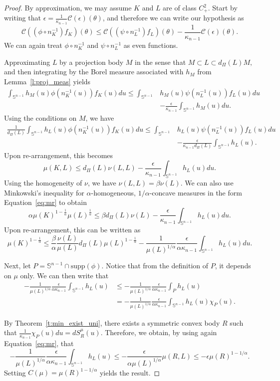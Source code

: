 \documentclass[11pt]{amsart}
\theoremstyle{definition}
\theoremstyle{remark}
\numberwithin{equation}{section}
\newcommand{\s}{\mathbb{S}}
\newcommand{\ct}[2]{\mathcal{C}({#1})({#2})}
\begin{document}
\begin{proof}
By approximation, we may assume $K$ and $L$ are of class $C^2_+$. Start by writing that $\epsilon=\frac{1}{\kappa_{n-1}}\ct{\epsilon}{\theta}$, and therefore we can write our hypothesis as
$$\ct{\left(\phi\circ n_K^{-1}\right)f_K}{\theta} \leq \ct{\left(\psi\circ n_L^{-1}\right)f_L}{\theta}-\frac{1}{\kappa_{n-1}}\ct{\epsilon}{\theta}.$$
We can again treat $\phi\circ n^{-1}_K$ and $\psi\circ n^{-1}_L$ as even functions.

Approximating $L$ by a projection body $M$ in the sense that $M\subset L \subset d_{\Pi}(L) M,$ and then integrating by the Borel measure associated with $h_M$ from Lemma~\ref{l:proj_meas} yields
\begin{align*}\int_{\s^{n-1}}h_M(u)\phi\left(n_{K}^{-1}(u)\right) f_{K}(u) du \leq \int_{\s^{n-1}} &h_M(u) \psi\left(n_L^{-1}(u)\right)f_L (u)du 
\\
&- \frac{\epsilon}{\kappa_{n-1}}\int_{\s^{n-1}}h_M(u)du.\end{align*}
Using the conditions on $M$, we have
\begin{align*}\frac{1}{d_{\Pi}(L)}\int_{\s^{n-1}}h_L(u)\phi\left(n_{K}^{-1}(u)\right) f_{K}(u) du \leq \int_{\s^{n-1}} &h_L(u) \psi\left( n_L^{-1}(u)\right)f_L (u)du
\\
&-\frac{\epsilon}{\kappa_{n-1}d_{\Pi}(L)}\int_{\s^{n-1}}h_L(u).
\end{align*}
Upon re-arrangement, this becomes
$$\mu(K,L)\leq d_{\Pi}(L)\nu(L,L)-\frac{\epsilon}{\kappa_{n-1}}\int_{\s^{n-1}}h_L(u)du.$$
Using the homogeneity of $\nu$, we have $\nu(L,L)=\beta\nu(L).$ We can also use Minkowski's inequality for $\alpha$-homogeneous, $1/\alpha$-concave measures in the form Equation~\ref{eq:mr} to obtain
$$\alpha\mu(K)^{1-\frac{1}{\alpha}} \mu(L)^{\frac{1}{\alpha}}\leq \beta d_{\Pi}(L)\nu(L)-\frac{\epsilon}{\kappa_{n-1}}\int_{\s^{n-1}}h_L(u)du.$$
Upon re-arrangement, this can be written as
$$\mu(K)^{1-\frac{1}{\alpha}} \leq \frac{\beta}{\alpha}\frac{\nu(L)}{\mu(L)} d_{\Pi}(L)\mu(L)^{1-\frac{1}{\alpha}}-\frac{1}{\mu(L)^{1/\alpha}}\frac{\epsilon}{\alpha\kappa_{n-1}}\int_{\s^{n-1}}h_L(u)du.$$

Next, let $P=\s^{n-1}\cap \text{supp}(\phi)$. Notice that from the definition of $P$, it depends on $\mu$ only. We can then write that
\begin{align*}-\frac{1}{\mu(L)^{1/\alpha}}\frac{\epsilon}{\alpha\kappa_{n-1}}\int_{\s^{n-1}}h_L(u)&\leq -\frac{1}{\mu(L)^{1/\alpha}}\frac{\epsilon}{\alpha\kappa_{n-1}}\int_{P}h_L(u)
\\
&= -\frac{1}{\mu(L)^{1/\alpha}}\frac{\epsilon}{\alpha\kappa_{n-1}}\int_{\s^{n-1}}h_L(u)\chi_P(u).
\end{align*}

By Theorem~\ref{t:min_exist_uni}, there exists a symmetric convex body $R$ such that $\frac{1}{\kappa_{n-1}}\chi_P(u)du=dS^{\mu}_{R}(u).$ Therefore, we obtain, by using again Equation~\ref{eq:mr}, that
$$-\frac{1}{\mu(L)^{1/\alpha}}\frac{\epsilon}{\alpha\kappa_{n-1}}\int_{\s^{n-1}}h_L(u)\leq -\frac{\epsilon}{\alpha\mu(L)^{1/\alpha}}\mu(R,L)\leq -\epsilon \mu(R)^{1-1/\alpha}.$$
Setting $C(\mu)=\mu(R)^{1-1/\alpha}$ yields the result.
\end{proof}
\end{document}
